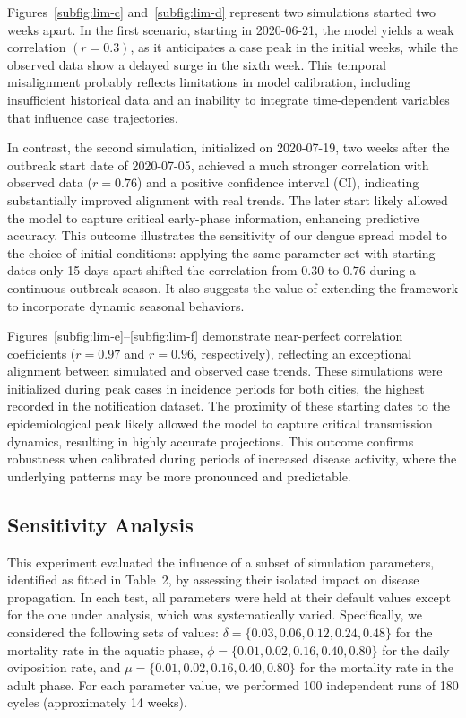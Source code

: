 Figures~\ref{subfig:lim-c} and~\ref{subfig:lim-d} represent two simulations started two weeks apart. In the first scenario, starting in 2020-06-21, the model yields a weak correlation $(r = 0.3)$, as it anticipates a case peak in the initial weeks, while the observed data show a delayed surge in the sixth week. This temporal misalignment probably reflects limitations in model calibration, including insufficient historical data and an inability to integrate time-dependent variables that influence case trajectories.

In contrast, the second simulation, initialized on 2020-07-19, two weeks after the outbreak start date of 2020-07-05, achieved a much stronger correlation with observed data ($r = 0.76$) and a positive confidence interval (CI), indicating substantially improved alignment with real trends. The later start likely allowed the model to capture critical early-phase information, enhancing predictive accuracy. This outcome illustrates the sensitivity of our dengue spread model to the choice of initial conditions: applying the same parameter set with starting dates only 15 days apart shifted the correlation from $0.30$ to $0.76$ during a continuous outbreak season. It also suggests the value of extending the framework to incorporate dynamic seasonal behaviors.


Figures~\ref{subfig:lim-e}--\ref{subfig:lim-f}  demonstrate near-perfect correlation coefficients ($r = 0.97$ and $r = 0.96$, respectively), reflecting an exceptional alignment between simulated and observed case trends. These simulations were initialized during peak cases in incidence periods for both cities, the highest recorded in the notification dataset. The proximity of these starting dates to the epidemiological peak likely allowed the model to capture critical transmission dynamics, resulting in highly accurate projections. This outcome confirms robustness when calibrated during periods of increased disease activity, where the underlying patterns may be more pronounced and predictable.

\subsection{Sensitivity Analysis}

This experiment evaluated the influence of a subset of simulation parameters, identified as fitted in Table~2, by assessing their isolated impact on disease propagation. In each test, all parameters were held at their default values except for the one under analysis, which was systematically varied. Specifically, we considered the following sets of values: $\delta = \{0.03, 0.06, 0.12, 0.24, 0.48\}$ for the mortality rate in the aquatic phase, $\phi = \{0.01, 0.02, 0.16, 0.40, 0.80\}$ for the daily oviposition rate, and $\mu = \{0.01, 0.02, 0.16, 0.40, 0.80\}$ for the mortality rate in the adult phase. For each parameter value, we performed 100 independent runs of 180 cycles (approximately 14 weeks).

